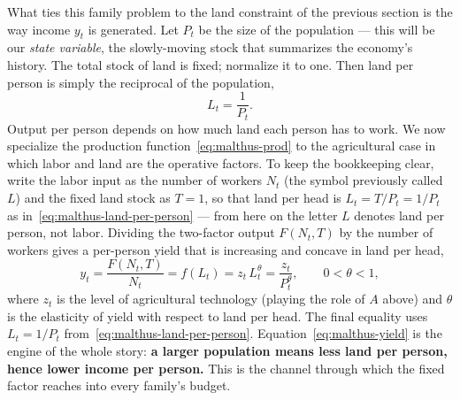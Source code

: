 What ties this family problem to the land constraint of the previous section is the way income $y_t$ is generated. Let $P_t$ be the size of the population --- this will be our \emph{state variable}, the slowly-moving stock that summarizes the economy's history. The total stock of land is fixed; normalize it to one. Then land per person is simply the reciprocal of the population,
\begin{equation}
L_t = \frac{1}{P_t}.
\label{eq:malthus-land-per-person}
\end{equation}
Output per person depends on how much land each person has to work. We now specialize the production function~\eqref{eq:malthus-prod} to the agricultural case in which labor and land are the operative factors. To keep the bookkeeping clear, write the labor input as the number of workers $N_t$ (the symbol previously called $L$) and the fixed land stock as $T=1$, so that land per head is $L_t = T/P_t = 1/P_t$ as in~\eqref{eq:malthus-land-per-person} --- from here on the letter $L$ denotes land per person, not labor. Dividing the two-factor output $F(N_t, T)$ by the number of workers gives a per-person yield that is increasing and concave in land per head,
\begin{equation}
y_t = \frac{F(N_t, T)}{N_t} = f(L_t) = z_t\, L_t^{\theta} = \frac{z_t}{P_t^{\theta}},
\qquad 0 < \theta < 1,
\label{eq:malthus-yield}
\end{equation}
where $z_t$ is the level of agricultural technology (playing the role of $A$ above) and $\theta$ is the elasticity of yield with respect to land per head. The final equality uses $L_t = 1/P_t$ from~\eqref{eq:malthus-land-per-person}. Equation~\eqref{eq:malthus-yield} is the engine of the whole story: \textbf{a larger population means less land per person, hence lower income per person.} This is the channel through which the fixed factor reaches into every family's budget.


